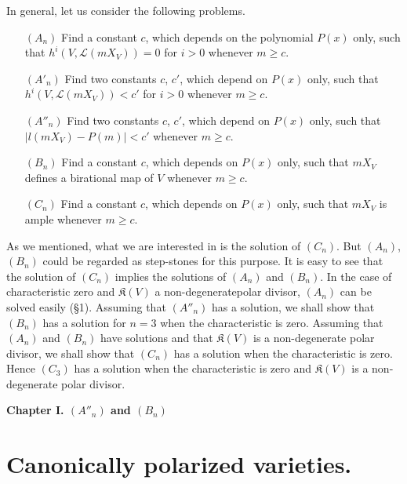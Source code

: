 In general, let us consider the following problems.
\begin{itemize}
\item[$(A_{n})$] Find a constant $c$, which depends on the polynomial $P(x)$ only, such that $h^{i}(V,\mathscr{L}(mX_{V}))=0$ for $i>0$ whenever $m\geq c$.

\item[$(A'_{n})$] Find two constants $c$, $c'$, which depend on $P(x)$ only, such that $h^{i}(V,\mathscr{L}(mX_{V}))<c'$ for $i>0$ whenever $m\geq c$.

\item[$(A''_{n})$] Find two constants $c$, $c'$, which depend on $P(x)$ only, such that $|l(mX_{V})-P(m)|<c'$ whenever $m\geq c$.

\item[$(B_{n})$] Find a constant $c$, which depends on $P(x)$ only, such that $mX_{V}$ defines a birational map of $V$ whenever $m\geq c$.

\item[$(C_{n})$] Find a constant $c$, which depends on $P(x)$ only, such that $mX_{V}$ is ample whenever $m\geq c$.
\end{itemize}
As we mentioned, what we are interested in is the solution of $(C_{n})$. But $(A_{n})$, $(B_{n})$ could be regarded as step-stones for this purpose. It is easy to see that the solution of $(C_{n})$ implies the solutions of $(A_{n})$ and $(B_{n})$. In the case of characteristic zero and $\mathfrak{K}(V)$ a non-degenerate\pageoriginale polar divisor, $(A_{n})$ can be solved easily (\S1). Assuming that $(A''_{n})$ has a solution, we shall show that $(B_{n})$ has a solution for $n=3$ when the characteristic is zero. Assuming that $(A_{n})$ and $(B_{n})$ have solutions and that $\mathfrak{K}(V)$ is a non-degenerate polar divisor, we shall show that $(C_{n})$ has a solution when the characteristic is zero. Hence $(C_{3})$ has a solution when the characteristic is zero and $\mathfrak{K}(V)$ is a non-degenerate polar divisor.

\bigskip

\begin{center}
{\Large\bf Chapter I. \boldmath$(A''_{n})$ and $(B_{n})$}
\end{center}

\section{Canonically polarized varieties.}\label{art14-chap1-sec1}


